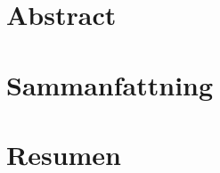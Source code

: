 \documentclass[showtrims, oldfontcommands]{kthesis}
\begin{document}
%
\frontmatter
{}
%
\maketitle

%
\pagestyle{empty}

%
\clearpage

\cleardoublepage

%
\clearpage

\cleardoublepage
{}

%
\cleardoublepage
{}
{}
\chapter*{Abstract}
\renewcommand{\abstractname}{\vspace{-\baselineskip}}
\begin{abstract}
    \label{abstract:thesis:en}

\end{abstract}
\clearpage

\cleardoublepage
{}
\chapter*{Sammanfattning}
\renewcommand{\abstractname}{\vspace{-\baselineskip}}
\begin{abstract}
    \label{abstract:thesis:sv}

\end{abstract}
\clearpage

\cleardoublepage
{}
\chapter*{Resumen}
\renewcommand{\abstractname}{\vspace{-\baselineskip}}
\begin{abstract}
    \label{abstract:thesis:es}

\end{abstract}
\clearpage
\end{document}
